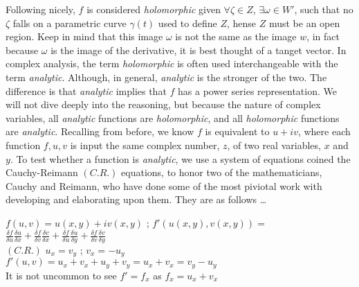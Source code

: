 \documentclass[a4paper,man,natbib]{apa6}
\begin{document}
Following nicely, $ f $ is considered \textit{holomorphic} given $ \forall \zeta \in Z $, $ \exists \omega \in W' $, 
such that no $ \zeta $ falls on a parametric curve $ \gamma(t) $ used to define $ Z $, hense $ Z $ must be an open region.
Keep in mind that this image $ \omega $ is not the same as the image $ w $, in fact because $ \omega $ is the image of the derivative, it is best thought of a tanget vector. 
In complex analysis, the term \textit{holomorphic} is often used interchangeable with the term \textit{analytic}.
Although, in general, \textit{analytic} is the stronger of the two. 
The difference is that \textit{analytic} implies that $ f $ has a power series representation.
We will not dive deeply into the reasoning, but because the nature of complex variables, 
all \textit{analytic} functions are \textit{holomorphic}, and all \textit{holomorphic} functions are \textit{analytic}.
Recalling from before, we know $ f $ is equivalent to $ u +iv $, where each function $ f,u,v $ is input the same complex number, $ z $, of two real variables, $ x $ and $ y $. 
To test whether a function is \textit{analytic}, we use a system of equations coined the Cauchy-Reimann $ (C.R.) $ equations, to honor two of the mathematicians, 
Cauchy and Reimann, who have done some of the most piviotal work with developing and elaborating upon them. They are as follows \dots

\begin{center}

      $ f(u,v) = u(x,y) +iv(x,y) $ ; $ f'(u(x,y),v(x,y)) = $$ \frac{\delta f}{\delta u} \frac{\delta u}{\delta x} + \frac{\delta f}{\delta v} \frac{\delta v}{\delta x} + 
      \frac{\delta f}{\delta u} \frac{\delta u}{\delta y} + \frac{\delta f}{\delta v} \frac{\delta v}{\delta y} $ 
      \\
      $ (C.R.) $ $ u_{x} = v_{y} $ ; $ v_{x} = -u_{y} $ 
      \\
      $ f'(u,v) = u_{x} + v_{x} + u_{y} + v_{y} = u_{x} + v_{x} = v_{y} - u_{y} $
      \\
      It is not uncommon to see $ f' = f_{x} $ as $ f_{x} = u_{x} + v_{x} $

\end{center}
\end{document}
